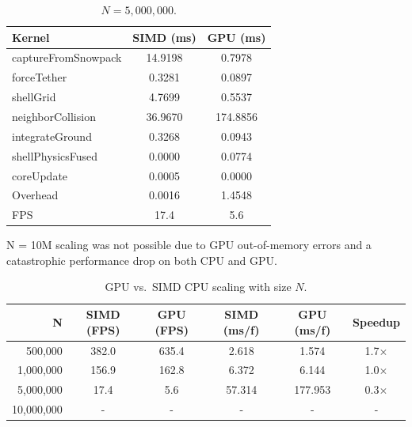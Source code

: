 \begin{table}[H]
  \caption{$N = 5{,}000{,}000$.}
  \label{tab:jetson_scaling_5m}
  \centering
  \scriptsize
  \begin{tabular}{@{}lcc@{}}
    \toprule
    \textbf{Kernel} & \textbf{SIMD (ms)} & \textbf{GPU (ms)} \\
    \midrule
    captureFromSnowpack        &  14.9198 &   0.7978 \\
    forceTether                &   0.3281 &   0.0897 \\
    shellGrid                  &   4.7699 &   0.5537 \\
    neighborCollision          &  36.9670 & 174.8856 \\
    integrateGround            &   0.3268 &   0.0943 \\
    shellPhysicsFused          &   0.0000 &   0.0774 \\
    coreUpdate                 &   0.0005 &   0.0000 \\
    Overhead                   &   0.0016 &   1.4548 \\
    \bottomrule
    FPS                        & 17.4 & 5.6 \\
  \end{tabular}
\end{table}

N = 10M scaling was not possible due to GPU out-of-memory errors and a catastrophic performance drop on both CPU and GPU.\\[1em]

\begin{table}[H]
  \caption{GPU vs.\ SIMD CPU scaling with size $N$.}
  \label{tab:jetson_scaling}
  \centering
  \scriptsize
  \begin{tabular}{@{}rccccc@{}}
    \toprule
    \textbf{N} & \textbf{SIMD (FPS)} & \textbf{GPU (FPS)} & \textbf{SIMD (ms/f)} & \textbf{GPU (ms/f)} & \textbf{Speedup} \\
    \midrule
       500{,}000 &   382.0 &   635.4 &  2.618 &   1.574 & 1.7$\times$ \\
     1{,}000{,}000 &   156.9 &   162.8 &  6.372 &   6.144 & 1.0$\times$ \\
     5{,}000{,}000 &    17.4 &     5.6 & 57.314 & 177.953 & 0.3$\times$ \\
    10{,}000{,}000 &     -  &     -  &    -  &     -  &    -  \\
    \bottomrule
  \end{tabular}
\end{table}

